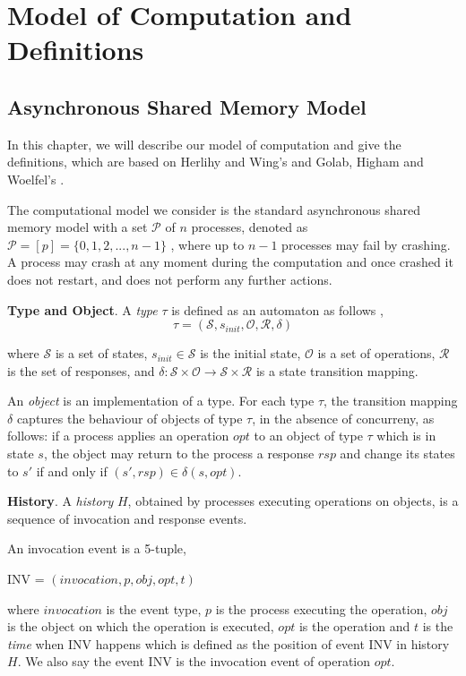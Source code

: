 

\chapter{Model of Computation and Definitions}
\section{Asynchronous Shared Memory Model}
In this chapter, we will describe our model of computation and give the definitions, which are based on Herlihy
and Wing's \cite{Herlihy:1990:LCC:78969.78972} and Golab, Higham and Woelfel's \cite{golab2011linearizable}.

The computational model we consider is the standard asynchronous shared memory model with a set $\mathcal{P}$
of $n$ processes, denoted as $\mathcal{P} = [p] =\{0, 1, 2,..., n-1\}$ , where up to $n-1$ processes may fail by crashing.
A process may crash at any moment during the computation and once crashed it does not restart,
and does not perform any further actions.

\textbf{Type and Object}.
A \emph{type} $\tau$ is defined as an automaton as follows \cite{InProc-GHHW2007a},
$$\tau = (\mathcal{S}, s_{init},\mathcal{O},\mathcal{R} ,\delta )$$

where $\mathcal{S}$ is a set of states, $s_{init} \in \mathcal{S}$ is the initial state, $\mathcal{O}$ is a set of
operations, $\mathcal{R}$ is the set of responses, and
$\delta :\mathcal{S} \times \mathcal{O} \to \mathcal{S} \times \mathcal{R}$ is a state transition mapping.

An \emph{object} is an implementation of a type. For each type $\tau$, the transition mapping $\delta$ captures the
behaviour of objects of type $\tau$, in the absence of concurreny,
as follows: if a process applies an operation $opt$ to an object of type $\tau$ which is in state $s$, the object
may return to the process a response $rsp$ and change its states to $s'$ if and only if $(s', rsp) \in \delta(s, opt)$.

\textbf{History}.
A \emph{history} $H$, obtained by processes executing
operations on objects, is a sequence of invocation
and response events.

An invocation event is a 5-tuple,
\begin{center}
INV = $(invocation, p, obj, opt, t)$
\end{center}
where $invocation$ is the event type, $p$ is the process executing the operation, $obj$ is the object on which the operation
is executed, $opt$ is the operation and $t$ is the \emph{time} when INV happens which is defined
as the position of event INV in history $H$. We also say the event INV is the invocation event of operation $opt$.

